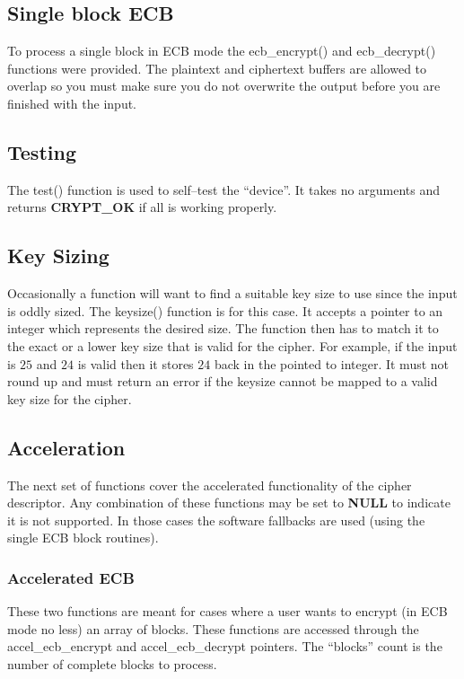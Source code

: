 \documentclass[a4paper]{book}
\begin{document}
\subsection{Single block ECB}
To process a single block in ECB mode the ecb\_encrypt() and ecb\_decrypt() functions were provided.  The plaintext and ciphertext buffers are allowed to overlap so you 
must make sure you do not overwrite the output before you are finished with the input.

\subsection{Testing}
The test() function is used to self--test the ``device''.  It takes no arguments and returns \textbf{CRYPT\_OK} if all is working properly.

\subsection{Key Sizing}
Occasionally a function will want to find a suitable key size to use since the input is oddly sized.  The keysize() function is for this case.  It accepts a 
pointer to an integer which represents the desired size.  The function then has to match it to the exact or a lower key size that is valid for the cipher.  For
example, if the input is $25$ and $24$ is valid then it stores $24$ back in the pointed to integer.  It must not round up and must return an error if the keysize
 cannot be mapped to a valid key size for the cipher.

\subsection{Acceleration}
The next set of functions cover the accelerated functionality of the cipher descriptor.  Any combination of these functions may be set to \textbf{NULL} to indicate
it is not supported.  In those cases the software fallbacks are used (using the single ECB block routines).

\subsubsection{Accelerated ECB}
These two functions are meant for cases where a user wants to encrypt (in ECB mode no less) an array of blocks.  These functions are accessed
through the accel\_ecb\_encrypt and accel\_ecb\_decrypt pointers.  The ``blocks'' count is the number of complete blocks to process.
\end{document}
